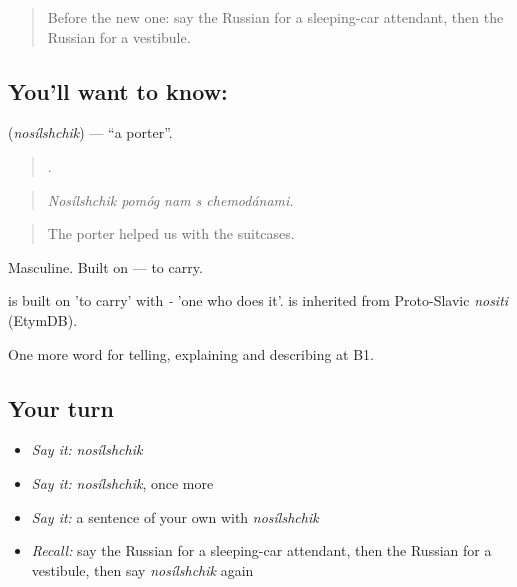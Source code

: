 \label{lesson:RU-C416-nosilshchik}



\begin{quote}
Before the new one: say the Russian for a sleeping-car attendant, then the Russian for a vestibule.
\end{quote}

\subsection*{You'll want to know: }
\textbf{} (\emph{nosílshchik}) — \textquotedblleft{}a porter\textquotedblright{}.

\begin{quote}
    .
\end{quote}

\begin{quote}
\emph{Nosílshchik pomóg nam s chemodánami.}
\end{quote}

\begin{quote}
The porter helped us with the suitcases.
\end{quote}

Masculine. Built on \emph{} — to carry.

\begin{cousinweb}
\emph{} is built on \emph{} 'to carry' with \emph{-} 'one who does it'. \emph{} is inherited from Proto-Slavic \emph{nositi} (EtymDB).
\end{cousinweb}

\begin{grammarlens}[title={What you've built}]
One more word for telling, explaining and describing at B1.
\end{grammarlens}

\subsection*{Your turn}
\begin{itemize}
\raggedright
  \item \emph{Say it:} \emph{nosílshchik}
  \item \emph{Say it:} \emph{nosílshchik}, once more
  \item \emph{Say it:} a sentence of your own with \emph{nosílshchik}
  \item \emph{Recall:} say the Russian for a sleeping-car attendant, then the Russian for a vestibule, then say \emph{nosílshchik} again
\end{itemize}

